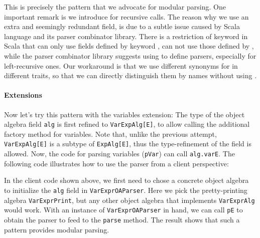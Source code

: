 This is precisely the pattern that we advocate for modular parsing. 
One important remark is we introduce  for recursive calls. 
The reason why we use an extra and seemingly redundant field, is due to a subtle issue caused by Scala language and its parser combinator library. There is a restriction of  keyword in Scala that  can only use fields defined by keyword , can not use those defined by , while the parser combinator library suggests using  to define parsers, especially for left-recursive ones. Our workaround is that we use different synonyms for  in different traits, so that we can directly distinguish them by names without using .

\paragraph{Extensions}
Now let's try this pattern with the variables extension:
\noindent The type of the object algebra field \lstinline{alg} is first refined 
to \lstinline{VarExpAlg[E]}, to allow calling the additional factory method 
for variables. Note that, unlike the previous attempt, \lstinline{VarExpAlg[E]}
is a subtype of \lstinline{ExpAlg[E]}, thus the type-refinement of the 
field is allowed. Now, the code for parsing variables (\lstinline{pVar}) can 
call \lstinline{alg.varE}. The following code illustrates how to use 
the parser from a client perspective:


In the client code shown above, we first need to chose a concrete 
object algebra to initialize the \lstinline{alg} field in \lstinline{VarExprOAParser}. Here we pick the 
pretty-printing algebra \lstinline{VarExprPrint}, but any other object 
algebra that implements \lstinline{VarExprAlg} would work. 
With an instance of \lstinline{VarExprOAParser} in hand, we can call 
\lstinline{pE} to obtain the parser to feed to the \lstinline{parse} method. 
The result shows that such a pattern provides modular parsing. 


